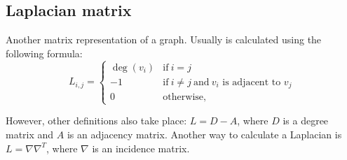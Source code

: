\subsection{Laplacian matrix}
\begin{frame}{\subsecname}
   Another matrix representation of a graph.
   Usually is calculated using the following formula:
   \begin{equation*}
       L_{i, j} =
       \begin{cases}
           \deg(v_i) & \mbox{if}\ i = j                                                 \\
           -1        & \mbox{if}\ i \neq j\ \mbox{and}\ v_i \mbox{ is adjacent to } v_j \\
           0         & \mbox{otherwise},
       \end{cases}
   \end{equation*}

   However, other definitions also take place: $L = D - A$, where $D$ is a degree matrix and $A$ is an adjacency matrix.
   Another way to calculate a Laplacian is $L = \nabla\nabla^{T}$, where $\nabla$ is an incidence matrix.
\end{frame}

